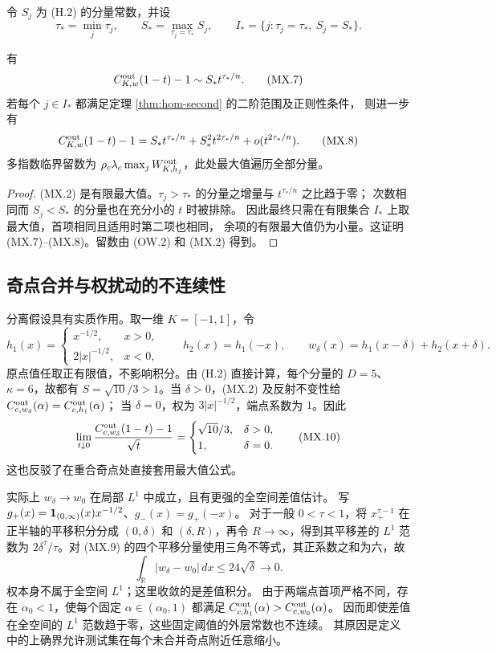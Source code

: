 令 $S_j$ 为 (H.2) 的分量常数，并设
\[\tau_* =\min_j\tau_j,\qquad
 S_* =\max_{\tau_j=\tau_*}S_j,\qquad
 I_* =\{j:\tau_j=\tau_*,\ S_j=S_*\}.\tag{MX.6}\]
\begin{corollary}[混合权的精确端点与临界极点]\label{cor:mixture-endpoint}
有
\[C^{\rm out}_{K,w}(1-t)-1\sim S_*t^{\tau_*/n}.\tag{MX.7}\]
若每个 $j\in I_*$ 都满足定理 \ref{thm:hom-second} 的二阶范围及正则性条件，
则进一步有
\[C^{\rm out}_{K,w}(1-t)-1
=S_*t^{\tau_*/n}+S_*^2t^{2\tau_*/n}+o(t^{2\tau_*/n}).\tag{MX.8}\]
多指数临界留数为
$\rho_c\lambda_c\max_jW^{\rm out}_{K,h_j}$，此处最大值遍历全部分量。
\end{corollary}
\begin{proof}
(MX.2) 是有限最大值。$\tau_j>\tau_*$ 的分量之增量与 $t^{\tau_*/n}$ 之比趋于零；
次数相同而 $S_j<S_*$ 的分量也在充分小的 $t$ 时被排除。
因此最终只需在有限集合 $I_*$ 上取最大值，首项相同且适用时第二项也相同，
余项的有限最大值仍为小量。这证明 (MX.7)--(MX.8)。留数由 (OW.2) 和 (MX.2) 得到。
\end{proof}

\subsection{奇点合并与权扰动的不连续性}\label{subsec:collision}
分离假设具有实质作用。取一维 $K=[-1,1]$，令
\[h_1(x)=\begin{cases}x^{-1/2},&x>0,\\2|x|^{-1/2},&x<0,\end{cases}
\qquad h_2(x)=h_1(-x),\qquad
w_\delta(x)=h_1(x-\delta)+h_2(x+\delta).\tag{MX.9}\]
原点值任取正有限值，不影响积分。由 (H.2) 直接计算，每个分量的 $D=5$、$\kappa=6$，故都有
$S=\sqrt{10}/3>1$。当 $\delta>0$，(MX.2) 及反射不变性给
$C^{\rm out}_{c,w_\delta}(\alpha)=C^{\rm out}_{c,h_1}(\alpha)$；
当 $\delta=0$，权为 $3|x|^{-1/2}$，端点系数为 $1$。因此
\[\lim_{t\downarrow0}\frac{C^{\rm out}_{c,w_\delta}(1-t)-1}{\sqrt t}
=\begin{cases}\sqrt{10}/3,&\delta>0,\\1,&\delta=0.\end{cases}\tag{MX.10}\]
这也反驳了在重合奇点处直接套用最大值公式。

实际上 $w_\delta\to w_0$ 在局部 $L^1$ 中成立，且有更强的全空间差值估计。
写 $g_+(x)=\mathbf 1_{(0,\infty)}(x)x^{-1/2}$、$g_-(x)=g_+(-x)$。
对于一般 $0<\tau<1$，将 $x_+^{\tau-1}$ 在正半轴的平移积分分成
$(0,\delta)$ 和 $(\delta,R)$，再令 $R\to\infty$，得到其平移差的 $L^1$ 范数为
$2\delta^\tau/\tau$。对 (MX.9) 的四个平移分量使用三角不等式，其正系数之和为六，故
\[\int_{\mathbb R}|w_\delta-w_0|\,dx\le24\sqrt\delta\longrightarrow0.
\tag{MX.11}\]
权本身不属于全空间 $L^1$；这里收敛的是差值积分。
由于两端点首项严格不同，存在 $\alpha_0<1$，使每个固定
$\alpha\in(\alpha_0,1)$ 都满足
$C^{\rm out}_{c,h_1}(\alpha)>C^{\rm out}_{c,w_0}(\alpha)$。
因而即使差值在全空间的 $L^1$ 范数趋于零，这些固定阈值的外层常数也不连续。
其原因是定义中的上确界允许测试集在每个未合并奇点附近任意缩小。
